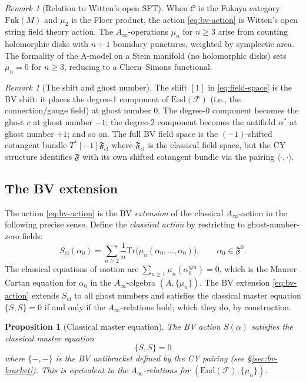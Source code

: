 \documentclass[11pt]{amsart}
\theoremstyle{plain}
\newtheorem{proposition}[theorem]{Proposition}
\theoremstyle{definition}
\theoremstyle{remark}
\newtheorem{remark}[theorem]{Remark}
\newcommand{\Ainf}{A_\infty}
\newcommand{\Fuk}{\mathrm{Fuk}}
\newcommand{\Tr}{\mathrm{Tr}}
\newcommand{\End}{\mathrm{End}}
\newcommand{\cC}{\mathcal{C}}
\newcommand{\cF}{\mathcal{F}}
\begin{document}
\begin{remark}[Relation to Witten's open SFT]
When $\cC$ is the Fukaya category $\Fuk(M)$ and $\mu_2$ is the Floer product, the action \eqref{eq:bv-action} is Witten's open string field theory action. The $\Ainf$-operations $\mu_n$ for $n \geq 3$ arise from counting holomorphic disks with $n+1$ boundary punctures, weighted by symplectic area. The formality of the A-model on a Stein manifold (no holomorphic disks) sets $\mu_n = 0$ for $n \geq 3$, reducing to a Chern--Simons functional.
\end{remark}

\begin{remark}[The shift and ghost number]
The shift $[1]$ in \eqref{eq:field-space} is the BV shift: it places the degree-1 component of $\End(\cF)$ (i.e., the connection/gauge field) at ghost number 0. The degree-0 component becomes the ghost $c$ at ghost number $-1$; the degree-2 component becomes the antifield $\alpha^*$ at ghost number $+1$; and so on. The full BV field space is the $(-1)$-shifted cotangent bundle $T^*[-1]\mathfrak{F}_{\mathrm{cl}}$ where $\mathfrak{F}_{\mathrm{cl}}$ is the classical field space, but the CY structure identifies $\mathfrak{F}$ with its own shifted cotangent bundle via the pairing $\langle \cdot, \cdot \rangle$.
\end{remark}

\subsection{The BV extension}
\label{subsec:bv-extension}

The action \eqref{eq:bv-action} is the BV \emph{extension} of the classical $\Ainf$-action in the following precise sense. Define the \emph{classical action} by restricting to ghost-number-zero fields:
\[
 S_{\mathrm{cl}}(\alpha_0) = \sum_{n \geq 2} \frac{1}{n}\Tr\bigl(\mu_n(\alpha_0, \ldots, \alpha_0)\bigr), \qquad \alpha_0 \in \mathfrak{F}^0.
\]
The classical equations of motion are $\sum_{n \geq 1} \mu_n(\alpha_0^{\otimes n}) = 0$, which is the Maurer--Cartan equation for $\alpha_0$ in the $\Ainf$-algebra $(A, \{\mu_n\})$. The BV extension \eqref{eq:bv-action} extends $S_{\mathrm{cl}}$ to all ghost numbers and satisfies the classical master equation $\{S, S\} = 0$ if and only if the $\Ainf$-relations hold; which they do, by construction.

\begin{proposition}[Classical master equation]
\label{prop:classical-me}
The BV action $S(\alpha)$ satisfies the classical master equation
\begin{equation}\label{eq:cme}
 \{S, S\} = 0
\end{equation}
where $\{-,-\}$ is the BV antibracket defined by the CY pairing (see \S\ref{sec:bv-bracket}). This is equivalent to the $\Ainf$-relations for $(\End(\cF), \{\mu_n\})$.
\end{proposition}
\end{document}
